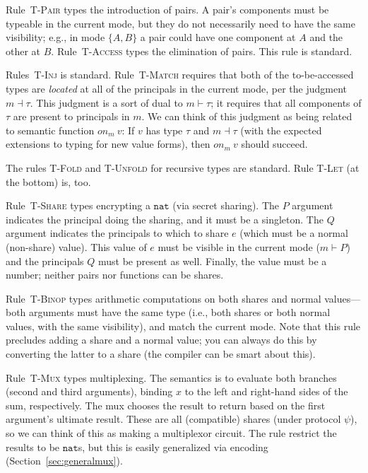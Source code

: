 \documentclass[10pt]{article}
\newcommand{\rulelab}[1]{{\small \textsc{#1}}}
\newcommand{\tnat}{\ensuremath{\mathtt{nat}}}
\newcommand{\getat}[2]{\ensuremath{\mathit{on}_{#1}~{#2}}}
\begin{document}
Rule~\rulelab{T-Pair} types the introduction of pairs. A pair's
components must be typeable in the current mode, but they do not
necessarily need to have the same visibility; e.g., in mode $\{A,B\}$
a pair could have one component at $A$ and the other at
$B$. Rule~\rulelab{T-Access} types the elimination of pairs. This rule
is standard.

Rules~\rulelab{T-Inj} is standard. Rule~\rulelab{T-Match} requires
that both of the to-be-accessed types are \emph{located} at all of the
principals in the current mode, per the judgment $m \dashv \tau$. This
judgment is a sort of dual to $m \vdash \tau$; it requires that all
components of $\tau$ are present to principals in $m$. We can think of
this judgment as being related to semantic function $\getat{m}{v}$: If $v$
has type $\tau$ and $m \dashv \tau$ (with the expected extensions to
typing for new value forms), then $\getat{m}{v}$ should succeed.

The rules \rulelab{T-Fold} and \rulelab{T-Unfold} for recursive types
are standard. Rule \rulelab{T-Let} (at the bottom) is, too.

Rule~\rulelab{T-Share} types encrypting a $\tnat$ (via secret
sharing). The $P$ argument indicates the principal doing the sharing,
and it must be a singleton. The $Q$ argument indicates the principals
to which to share $e$ (which must be a normal (non-share) value). This
value of $e$ must be visible in the current mode ($m \vdash P$) and
the principals $Q$ must be present as well. Finally, the value must be
a number; neither pairs nor functions can be shares.

Rule~\rulelab{T-Binop} types arithmetic computations on both shares
and normal values---both arguments must have the same type (i.e., both
shares or both normal values, with the same visibility), and match the
current mode. Note that this rule precludes adding a 
share and a normal value; you can always do this by converting the
latter to a share (the compiler can be smart about this).

Rule~\rulelab{T-Mux} types multiplexing. The semantics is to evaluate
both branches (second and third arguments), binding $x$ to the left
and right-hand sides of the sum, respectively. The mux chooses
the result to return based on the first argument's ultimate
result. These are all (compatible) shares (under protocol $\psi$), so
we can think of this as making a multiplexor circuit. The rule
restrict the results to be $\tnat$s, but this is easily generalized
via encoding (Section~\ref{sec:generalmux}).
\end{document}
